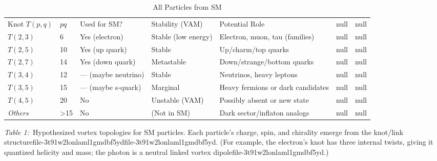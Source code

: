 \documentclass[a4paper,12pt]{article}
\begin{document}
\begin{table}
\begin{tabular}{lllllll}
            Knot $T(p,q)$ & $pq$ & Used for SM? & Stability (VAM) & Potential Role & null & null \\
            $T(2,3)$ & 6 & Yes (electron) & Stable (low energy) & Electron, muon, tau (families) & null & null \\
            $T(2,5)$ & 10 & Yes (up quark) & Stable & Up/charm/top quarks & null & null \\
            $T(2,7)$ & 14 & Yes (down quark) & Metastable & Down/strange/bottom quarks & null & null \\
            $T(3,4)$ & 12 & — (maybe neutrino) & Stable & Neutrinos, heavy leptons & null & null \\
            $T(3,5)$ & 15 & — (maybe s-quark) & Marginal & Heavy fermions or dark candidates & null & null \\
            $T(4,5)$ & 20 & No & Unstable (VAM) & Possibly absent or new state & null & null \\
            \textit{Others} & >15 & No & (Not in SM) & Dark sector/inflaton analogs & null & null \\
            \bottomrule
        \end{tabular}
        \caption{All Particles from SM}
        \label{tab:}
    \end{table}




\textit{Table 1:} Hypothesized vortex topologies for SM particles. Each particle’s charge, spin, and chirality emerge from the knot/link structurefile-3t91w2lonlaml1gmdbf5ydfile-3t91w2lonlaml1gmdbf5yd. (For example, the electron’s knot has three internal twists, giving it quantized helicity and mass; the photon is a neutral linked vortex dipolefile-3t91w2lonlaml1gmdbf5yd.)
\end{document}
